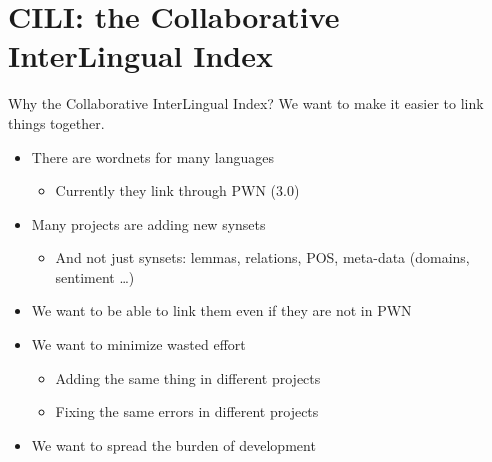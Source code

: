 \documentclass{beamer}
\begin{document}


\section{CILI: the Collaborative InterLingual Index}
\begin{frame}{Why the Collaborative InterLingual Index?}
We want to make it easier to link things together.
  \begin{itemize}
  \item There are wordnets for many languages
    \begin{itemize}
    \item Currently they link through PWN (3.0)
    \end{itemize}
  \item Many projects are adding new synsets 
    \begin{itemize}
    \item And not just synsets: lemmas, relations, POS, meta-data
      (domains, sentiment \ldots)
    \end{itemize}
  \item We want to be able to link them even if they are not in PWN
  \item We want to minimize wasted effort
    \begin{itemize}
    \item Adding the same thing in different projects
    \item Fixing the same errors in different projects
    \end{itemize}
  \item We want to spread the burden of development
  \end{itemize}
  
\end{frame}
\end{document}
